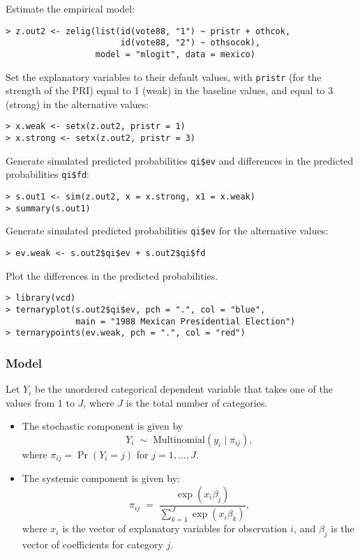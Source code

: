 \begin{enumerate}
Estimate the empirical model:  
\begin{verbatim}
> z.out2 <- zelig(list(id(vote88, "1") ~ pristr + othcok,
                       id(vote88, "2") ~ othsocok), 
                  model = "mlogit", data = mexico)
\end{verbatim}
Set the explanatory variables to their default values, with {\tt pristr}
(for the strength of the PRI) equal to 1 (weak) in the baseline values, and
equal to 3 (strong) in the alternative values:  
\begin{verbatim}
> x.weak <- setx(z.out2, pristr = 1)
> x.strong <- setx(z.out2, pristr = 3)
\end{verbatim}
Generate simulated predicted probabilities {\tt qi\$ev} and differences in
the predicted probabilities {\tt qi\$fd}:
\begin{verbatim}
> s.out1 <- sim(z.out2, x = x.strong, x1 = x.weak)
> summary(s.out1)
\end{verbatim}
Generate simulated predicted probabilities {\tt qi\$ev} for the
alternative values:  
\begin{verbatim}
> ev.weak <- s.out2$qi$ev + s.out2$qi$fd
\end{verbatim}
Plot the differences in the predicted probabilities.  
\begin{verbatim}
> library(vcd)
> ternaryplot(s.out2$qi$ev, pch = ".", col = "blue", 
              main = "1988 Mexican Presidential Election")
> ternarypoints(ev.weak, pch = ".", col = "red")
\end{verbatim}
\end{enumerate}

\subsubsection{Model}
Let $Y_i$ be the unordered categorical dependent variable that takes
one of the values from 1 to $J$, where $J$ is the total number of
categories.

\begin{itemize}
\item The stochastic component is given by
  \begin{equation*}
    Y_i \; \sim \; \textrm{Multinomial}(y_{i} \mid \pi_{ij}), 
  \end{equation*}
  where $\pi_{ij}=\Pr(Y_i=j)$ for $j=1,\dots,J$. 
  
\item The systemic component is given by:  
  \begin{equation*}
    \pi_{ij}\; = \; \frac{\exp(x_{i}\beta_{j})}{\sum^{J}_{k = 1}
      \exp(x_{i}\beta_{k})},
  \end{equation*}
  where $x_i$ is the vector of explanatory variables for observation
  $i$, and $\beta_j$ is the vector of coefficients for category $j$.
\end{itemize}

